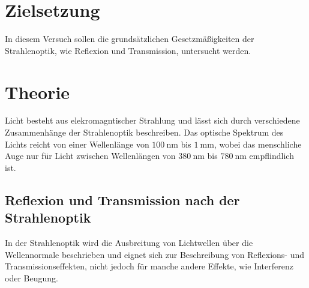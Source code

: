 \section{Zielsetzung}
In diesem Versuch sollen die grundsätzlichen Gesetzmäßigkeiten der Strahlenoptik, wie Reflexion und Transmission,
untersucht werden.

\section{Theorie}
\label{sec:Theorie}
Licht besteht aus elekromagntischer Strahlung und lässt sich durch verschiedene Zusammenhänge der Strahlenoptik beschreiben.
Das optische Spektrum des Lichts reicht von einer Wellenlänge von $\qty{100}{\nano\metre}$ bis $\qty{1}{\milli\metre}$, wobei
das menschliche Auge nur für Licht zwischen Wellenlängen von $\qty{380}{\nano\metre}$ bis $\qty{780}{\nano\metre}$ 
empflindlich ist.

\subsection{Reflexion und Transmission nach der Strahlenoptik}
In der Strahlenoptik wird die Ausbreitung von Lichtwellen über die Wellennormale beschrieben und eignet sich zur Beschreibung
von Reflexions- und Transmissionseffekten, nicht jedoch für manche andere Effekte, wie Interferenz oder Beugung. 

